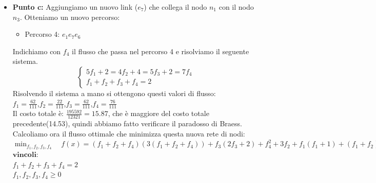 \documentclass[a4paper,12pt]{article}
\begin{document}
\begin{itemize}
			I quali rispettano tutti i vincoli del grafo.\\
			Il costo totale è $\frac{2456}{169}$. L'ho ottenuto sostituendo i valori dei vari flussi nella formula del costo totale.\\
			Il prezzo di anarchia vale $\frac{1228}{1183}=1.038$
			\item \textbf{Punto c: }Aggiungiamo un nuovo link ($e_7$) che collega il nodo $n_1$ con il nodo $n_3$.
			Otteniamo un nuovo percorso:
			\begin{itemize}
				\item Percorso 4: $e_1 e_7 e_6$
			\end{itemize}
			Indichiamo con $f_4$ il flusso che passa nel percorso 4 e risolviamo il seguente sistema.
			\begin{equation}
				\begin{cases}
					5f_1+2=4f_2+4=5f_3+2=7f_4 \\
					f_1+f_2+f_3+f_4=2
				\end{cases}
			\end{equation}
			Risolvendo il sistema a mano si ottengono questi valori di flusso:\\
			$f_1=\frac{62}{111}$,$f_2=\frac{22}{111}$,$f_3=\frac{62}{111}$,$f_4=\frac{76}{111}$\\
			Il costo totale è: $\frac{195592}{12321}=15.87$, che è maggiore del costo totale precedente(14.53), quindi abbiamo fatto verificare il paradosso di Braess. \\
			Calcoliamo ora il flusso ottimale che minimizza questa nuova rete di nodi:\\
			\newpage
				$\min_{f_1, f_2, f_3, f_4} \quad f(x) = (f_1+f_2+f_4)(3(f_1+f_2+f_4))+f_3(2f_3+2)+f_4^2+3f_2+
				f_1(f_1+1)+(f_1+f_2)(1+(f_1+f_2))+(f_3+f_4)3(f_3+f_4)$ \\
				$\textbf{vincoli:} $\\
				$f_1 + f_2+f_3+f_4 = 2$ \\
				$f_1,f_2,f_3,f_4 \geq 0$\\
				

\end{itemize}
\end{document}
